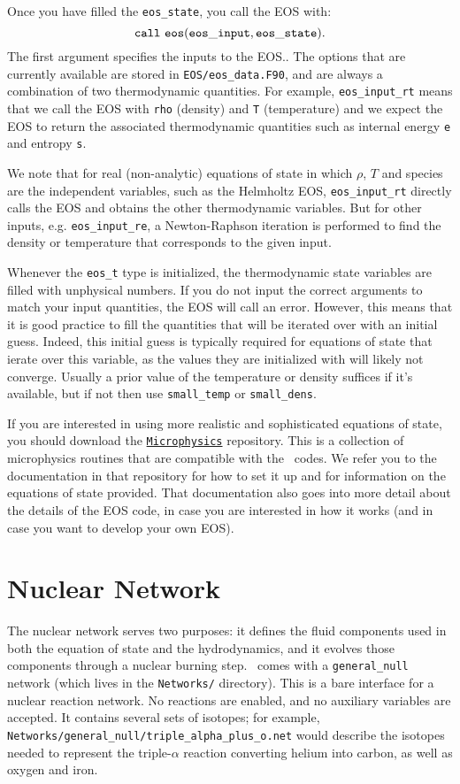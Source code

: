 Once you have filled the {\tt eos\_state}, you call the EOS with:
\[
  {\tt call\ eos (eos\_input, eos\_state)}.
\]
The first argument specifies the inputs to the EOS.. The options 
that are currently available are stored in
{\tt EOS/eos\_data.F90}, and are always a combination of two
thermodynamic quantities. For example, {\tt eos\_input\_rt} means 
that we call the EOS with {\tt rho} (density) and {\tt T} (temperature) 
and we expect the EOS to return the associated thermodynamic 
quantities such as internal energy {\tt e} and entropy {\tt s}.

We note that for real (non-analytic) equations of state
in which $\rho$, $T$ and species are the independent variables, such
as the Helmholtz EOS, {\tt eos\_input\_rt} directly calls the EOS
and obtains the other thermodynamic variables. But for other inputs,
e.g. {\tt eos\_input\_re}, a Newton-Raphson iteration is performed
to find the density or temperature that corresponds to the given
input.

Whenever the \texttt{eos\_t} type is initialized, the
thermodynamic state variables are filled with unphysical numbers. If
you do not input the correct arguments to match your input quantities,
the EOS will call an error. However, this means that it is good
practice to fill the quantities that will be iterated over with an
initial guess. Indeed, this initial guess is typically required for 
equations of state that ierate over this variable, as the values 
they are initialized with will likely not
converge. Usually a prior value of the temperature or density suffices
if it's available, but if not then use \texttt{small\_temp} or
\texttt{small\_dens}.

If you are interested in using more realistic and sophisticated equations of 
state, you should download the \href{https://github.com/BoxLib-Codes/Microphysics}{\tt Microphysics} 
repository. This is a collection of microphysics routines that are compatible with the 
\boxlib\ codes. We refer you to the documentation in that repository for how to set it up 
and for information on the equations of state provided. That documentation 
also goes into more detail about the details of the EOS code, in case you are interested in 
how it works (and in case you want to develop your own EOS).

\section{Nuclear Network}

The nuclear network serves two purposes: it defines the fluid components used 
in both the equation of state and the hydrodynamics, and it evolves those 
components through a nuclear burning step. \castro\ comes with a {\tt general\_null} 
network (which lives in the {\tt Networks/} directory). This is a bare interface for a
nuclear reaction network. No reactions are enabled, and no auxiliary variables 
are accepted. It contains several sets of isotopes; for example, 
{\tt Networks/general\_null/triple\_alpha\_plus\_o.net} would describe the 
isotopes needed to represent the triple-$\alpha$ reaction converting 
helium into carbon, as well as oxygen and iron.

